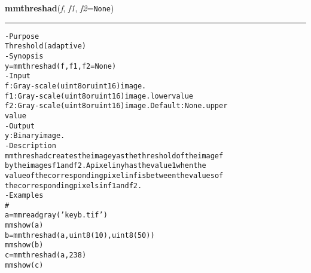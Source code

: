     \begin{boxedminipage}{\textwidth}

    \raggedright \textbf{mmthreshad}(\textit{f}, \textit{f1}, \textit{f2}=\texttt{N\-o\-n\-e\-})

    \vspace{-1.5ex}

    \rule{\textwidth}{0.5\fboxrule}
\begin{alltt}
- Purpose
    Threshold (adaptive)
- Synopsis
    y = mmthreshad(f, f1, f2=None)
- Input
    f:  Gray-scale (uint8 or uint16) image.
    f1: Gray-scale (uint8 or uint16) image. lower value
    f2: Gray-scale (uint8 or uint16) image. Default: None. upper
        value
- Output
    y: Binary image.
- Description
    mmthreshad creates the image y as the threshold of the image f
    by the images f1 and f2 . A pixel in y has the value 1 when the
    value of the corresponding pixel in f is between the values of
    the corresponding pixels in f1 and f2 .
- Examples
    \#
    a = mmreadgray('keyb.tif')
    mmshow(a)
    b = mmthreshad(a,uint8(10), uint8(50))
    mmshow(b)
    c = mmthreshad(a,238)
    mmshow(c)\end{alltt}

    \vspace{1ex}

    \end{boxedminipage}

    \label{multireg:num_pymorph:mmtoggle}
    \vspace{0.5ex}

